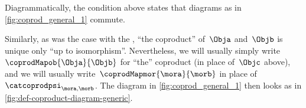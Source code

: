 \begin{remark}
    Diagrammatically, the condition above states that diagrams as in \cref{fig:coprod_general_1} commute.
    \begin{marginfigure}
        \centering
        \caption{}
        \label{fig:coprod_general_1}
        \label{fig:def-coproduct-diagram}
    \end{marginfigure}
    Similarly, as was the case with the , ``the coproduct'' of~$\Obja$ and~$\Objb$ is unique only ``up to isomorphism''.
    Nevertheless, we will usually simply write~$\coprodMapob{\Obja}{\Objb}$ for ``the'' coproduct (in place of~$\Objc$ above), and we will usually write~$\coprodMapmor{\mora}{\morb}$ in place of~$\catcoprodpsi_{\mora, \morb}$.
    The diagram in \cref{fig:coprod_general_1} then looks as in \cref{fig:def-coproduct-diagram-generic}.
\end{remark}

\begin{marginfigure}
    \centering
    \caption{}
    \label{fig:def-coproduct-diagram-generic}
\end{marginfigure}
%
%

%




